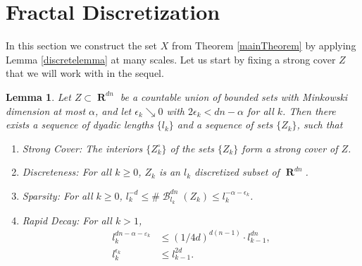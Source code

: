 \documentclass[dvipsnames,letterpaper,12pt]{article}
\numberwithin{equation}{section}
\theoremstyle{plain}
\newtheorem{lemma}{Lemma}
\theoremstyle{remark}
\DeclareMathOperator{\RR}{\mathbf{R}}
\DeclareMathOperator{\B}{\mathcal{B}}
\begin{document}
\section{Fractal Discretization}\label{discretizationsection}

In this section we construct the set $X$ from Theorem \ref{mainTheorem} by applying Lemma \ref{discretelemma} at many scales. Let us start by fixing a strong cover $Z$ that we will work with in the sequel.


\begin{lemma}\label{coveringLemma}
	Let $Z \subset \RR^{dn}$ be a countable union of bounded sets with Minkowski dimension at most $\alpha$, and let $\epsilon_k \searrow 0$ with $2\epsilon_k < dn - \alpha$ for all $k$. Then there exists a sequence of dyadic lengths $\{ l_k \}$ and a sequence of sets $\{ Z_k \}$, such that
	\begin{enumerate}
		\item\label{StrongCoverProperty} \emph{Strong Cover}: The interiors $\{ Z_k^\circ \}$ of the sets $\{ Z_k \}$ form a strong cover of $Z$.

		\item\label{DiscretenessProperty} \emph{Discreteness}: For all $k \geq 0$, $Z_k$ is an $l_k$ discretized subset of $\RR^{dn}$.

		\item\label{SparsityProperty} \emph{Sparsity}: For all $k \geq 0$, $l_k^{-d} \leq \#\B^{dn}_{l_k}(Z_k) \leq l_k^{-\alpha-\epsilon_k}$.

		\item\label{RapidDecayProperty} \emph{Rapid Decay}: For all $k > 1$,
			\begin{align}
				l_k^{dn-\alpha-\varepsilon_k} & \leq (1/4d)^{d(n-1)} \cdot l_{k-1}^{dn} \label{coverBoundRequirement}, \\
				l_k^{\epsilon_k} & \leq l_{k-1}^{2d}\label{quadDecayRequirement}.
			\end{align}
	\end{enumerate}
\end{lemma}
\end{document}
